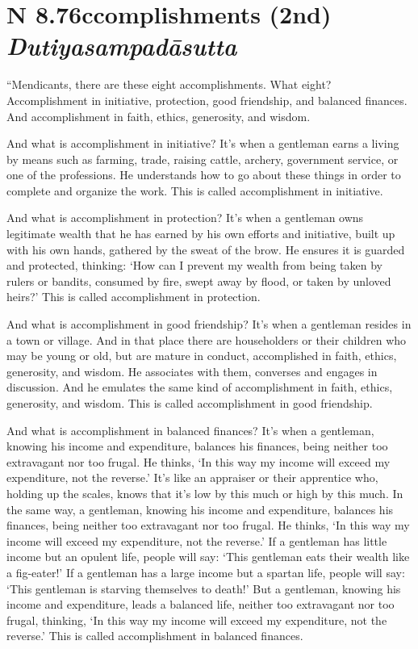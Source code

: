 \documentclass[12pt,openany]{book}%
\newcommand*{\suttatitleacronym}[1]{\smaller[2]{#1}\vspace*{.3em}}
\newcommand*{\suttatitletranslation}[1]{\linebreak{#1}}
\newcommand*{\suttatitleroot}[1]{\linebreak\smaller[2]\itshape{#1}}
\newcommand*{\tocacronym}[1]{\hspace*{-3.3em}{#1}\quad}
\newcommand*{\toctranslation}[1]{#1}
\newcommand*{\tocroot}[1]{(\textit{#1})}
\begin{document}
%
\section*{{\suttatitleacronym AN 8.76}{\suttatitletranslation Accomplishments (2nd) }{\suttatitleroot Dutiyasampadāsutta}}
\addcontentsline{toc}{section}{\tocacronym{AN 8.76} \toctranslation{Accomplishments (2nd) } \tocroot{Dutiyasampadāsutta}}

“Mendicants, there are these eight accomplishments. What eight? Accomplishment in initiative, protection, good friendship, and balanced finances. And accomplishment in faith, ethics, generosity, and wisdom. 

And what is accomplishment in initiative? It’s when a gentleman earns a living by means such as farming, trade, raising cattle, archery, government service, or one of the professions. He understands how to go about these things in order to complete and organize the work. This is called accomplishment in initiative. 

And what is accomplishment in protection? It’s when a gentleman owns legitimate wealth that he has earned by his own efforts and initiative, built up with his own hands, gathered by the sweat of the brow. He ensures it is guarded and protected, thinking: ‘How can I prevent my wealth from being taken by rulers or bandits, consumed by fire, swept away by flood, or taken by unloved heirs?’ This is called accomplishment in protection. 

And what is accomplishment in good friendship? It’s when a gentleman resides in a town or village. And in that place there are householders or their children who may be young or old, but are mature in conduct, accomplished in faith, ethics, generosity, and wisdom. He associates with them, converses and engages in discussion. And he emulates the same kind of accomplishment in faith, ethics, generosity, and wisdom. This is called accomplishment in good friendship. 

And what is accomplishment in balanced finances? It’s when a gentleman, knowing his income and expenditure, balances his finances, being neither too extravagant nor too frugal. He thinks, ‘In this way my income will exceed my expenditure, not the reverse.’ It’s like an appraiser or their apprentice who, holding up the scales, knows that it’s low by this much or high by this much. In the same way, a gentleman, knowing his income and expenditure, balances his finances, being neither too extravagant nor too frugal. He thinks, ‘In this way my income will exceed my expenditure, not the reverse.’ If a gentleman has little income but an opulent life, people will say: ‘This gentleman eats their wealth like a fig-eater!’ If a gentleman has a large income but a spartan life, people will say: ‘This gentleman is starving themselves to death!’ But a gentleman, knowing his income and expenditure, leads a balanced life, neither too extravagant nor too frugal, thinking, ‘In this way my income will exceed my expenditure, not the reverse.’ This is called accomplishment in balanced finances. 
\end{document}
